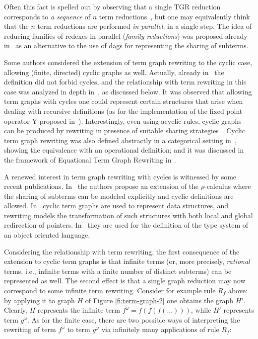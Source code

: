 \documentclass{eptcs}
\theoremstyle{plain}
\theoremstyle{definition}
\begin{document}
Often this fact is spelled out by observing that a single TGR
reduction corresponds to \emph{a sequence} of $n$ term reductions~\cite{BEGKPS:TGR,HP:ITRJ}, but one may equivalently think 
that the $n$ term reductions are performed \emph{in parallel}, in a
single step. The idea of reducing families of redexes in
parallel (\emph{family reductions}) was proposed already in~\cite{DBLP:journals/jcss/Vuillemin74,DBLP:journals/jacm/BerryL79} as
an alternative to the use of dags for representing the sharing of subterms.


Some authors considered the extension of term
graph rewriting to the cyclic case, allowing (finite, directed)
cyclic graphs as well. Actually, already in~\cite{BEGKPS:TGR} the
definition did not forbid cycles, and the relationship with 
term rewriting in this case was analyzed in depth
in~\cite{KKSV:AGRS}, as discussed below. It was observed that
allowing term graphs with cycles one could represent certain
structures that arise when dealing with recursive definitions (as for
the implementation of the fixed point operator {\sf Y} proposed
in~\cite{DBLP:journals/spe/Turner79}). Interestingly, even using
acyclic rules, cyclic graphs can be produced by rewriting in
presence of suitable sharing strategies~\cite{FRW:CPCR,FW:RCTG}.
Cyclic term graph rewriting was also defined abstractly in a
categorical setting in~\cite{CG:RCSE}, showing the equivalence with an
operational definition; and it was discussed in the framework of
Equational Term Graph Rewriting in~\cite{DBLP:journals/fuin/AriolaK96}.

A renewed interest in term graph rewriting with cycles is witnessed by
some recent publications. In~\cite{DBLP:journals/mscs/BaldanBCK07,DBLP:journals/entcs/BaldanBCK08}
the authors propose an extension of the $\rho$-calculus where the
sharing of subterms can be modeled explicitly and cyclic definitions
are allowed. In~\cite{DBLP:journals/entcs/DuvalEP07} cyclic term
graphs are used to represent data structures, 
and rewriting models the transformation of such structures with both
local and global redirection of pointers. In~\cite{DBLP:journals/mscs/DoughertyLL06}
they are used for the definition of the type system of an object
oriented language. 

Considering the relationship with term rewriting, the first 
consequence of the extension to cyclic term graphs is
that infinite terms (or, more precisely, \emph{rational} terms,
i.e., infinite terms with a finite number of distinct subterms) can
be represented as well. The second effect is that
a single graph reduction may now correspond to some infinite
term rewriting. Consider for example rule $R_f$ above: by applying it
to  graph $H$ of Figure \ref{fi:term-graph-2} one obtains the graph 
$H'$. Clearly, $H$
represents the infinite term $f^\omega = f(f(f(\ldots)))$, while $H'$
represents term $g^\omega$. As for the finite case, there are  
two possible ways of
interpreting the rewriting of term $f^\omega$ to term $g^\omega$ via
infinitely many applications of rule $R_f$:
\end{document}
